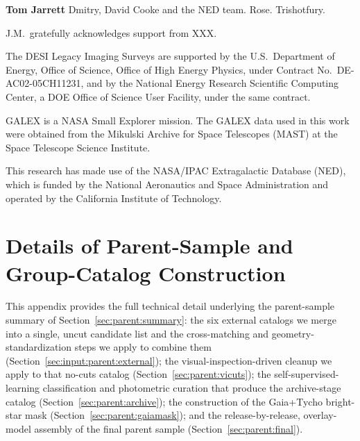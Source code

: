 \documentclass[modern,linenumbers]{aastex701}
\begin{document}
\begin{acknowledgments}

\textbf{Tom Jarrett} Dmitry, David Cooke and the NED
team. Rose. Trishotfury.

J.M.\ gratefully acknowledges support from XXX.

The DESI Legacy Imaging Surveys are supported by the U.S.\ Department of
Energy, Office of Science, Office of High Energy Physics, under Contract
No.\ DE-AC02-05CH11231, and by the National Energy Research Scientific
Computing Center, a DOE Office of Science User Facility, under the same
contract.

GALEX is a NASA Small Explorer mission. The GALEX data used in this work
were obtained from the Mikulski Archive for Space Telescopes (MAST) at the
Space Telescope Science Institute.

This research has made use of the NASA/IPAC Extragalactic Database (NED),
which is funded by the National Aeronautics and Space Administration and
operated by the California Institute of Technology.

\end{acknowledgments}



\appendix

\section{Details of Parent-Sample and Group-Catalog Construction}
\label{sec:appendix:parent}

This appendix provides the full technical detail underlying the
parent-sample summary of Section~\ref{sec:parent:summary}: the six
external catalogs we merge into a single, uncut candidate list and the
cross-matching and geometry-standardization steps we apply to combine
them (Section~\ref{sec:input:parent:external}); the
visual-inspection-driven cleanup we apply to that no-cuts catalog
(Section~\ref{sec:parent:vicuts}); the self-supervised-learning
classification and photometric curation that produce the archive-stage
catalog (Section~\ref{sec:parent:archive}); the construction of the
Gaia+Tycho bright-star mask (Section~\ref{sec:parent:gaiamask}); and the
release-by-release, overlay-model assembly of the final parent sample
(Section~\ref{sec:parent:final}).
\end{document}
